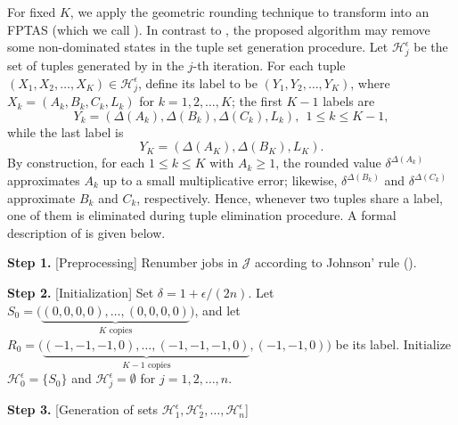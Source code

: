 \documentclass[12pt]{article}
\begin{document}
\begin{sloppypar}
        For fixed $K$, we apply the geometric rounding technique to transform  into an FPTAS (which we call ). In contrast to , the proposed algorithm may remove some non-dominated states in the tuple set generation procedure. Let $\mathcal{H}_j^{\epsilon}$ be the set of tuples generated by  in the $j$-th iteration. For each tuple $(X_1, X_2, \ldots, X_K) \in \mathcal{H}_j^{\epsilon}$, define its label to be $(Y_1, Y_2, \ldots, Y_K)$, where $X_k=(A_k, B_k, C_k, L_k)$ for $k=1, 2, \ldots, K$; the first $K-1$ labels are
        \begin{equation*}
            Y_k=(\Delta(A_k), \Delta(B_k), \Delta(C_k), L_k), ~~ 1 \leq k \leq K-1, 
        \end{equation*}
        while the last label is
        \begin{equation*}
            Y_K=(\Delta(A_K), \Delta(B_K), L_K).
        \end{equation*}
        By construction, for each $1 \leq k \leq K$ with $A_k \geq 1$, the rounded value $\delta^{\Delta(A_k)}$ approximates $A_k$ up to a small multiplicative error; likewise, $\delta^{\Delta(B_k)}$ and $\delta^{\Delta(C_k)}$ approximate $B_k$ and $C_k$, respectively. Hence, whenever two tuples share a label, one of them is eliminated during tuple elimination procedure. A formal description of  is given below.
        
        \begin{algorithm}[H]
            \small
            \linespread{1.2}\selectfont
            \SetAlgoLined
            \DontPrintSemicolon
            \caption{An FPTAS for $F2 \mid \mid C_{\max}^w$}  \label{alg-FPTAS}
            \BlankLine
            \textbf{Step 1.} [Preprocessing] Renumber jobs in $\mathcal{J}$ according to Johnson' rule (). \;
            
            \textbf{Step 2.} [Initialization] Set $\delta=1+\epsilon/(2n)$. Let  $S_0=\Big(\underbrace{(0,0,0,0),\ldots,(0,0,0,0)}_{K\text{ copies}}\Big)$, and let $R_0=\Big(\underbrace{(-1, -1, -1, 0),\ldots,(-1, -1, -1, 0)}_{K-1\text{ copies}}, (-1, -1, 0)\Big)$ be its label. Initialize $\mathcal{H}_0^{\epsilon}=\{S_0\}$ and $\mathcal{H}_j^{\epsilon}=\emptyset$ for $j=1, 2, \ldots, n$. \;
            
            \textbf{Step 3.} [Generation of sets $\mathcal{H}_1^{\epsilon}, \mathcal{H}_2^{\epsilon}, \ldots, \mathcal{H}_n^{\epsilon}$] 
            

\end{algorithm}
\end{sloppypar}
\end{document}
